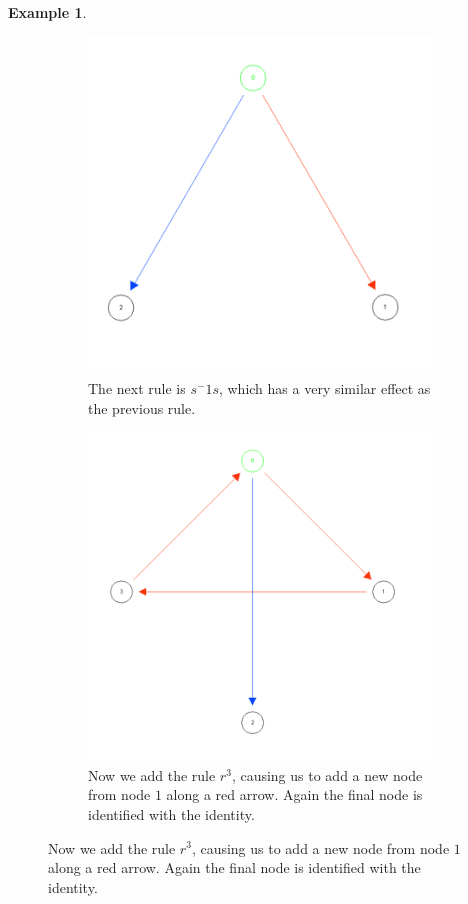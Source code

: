 \documentclass[10pt]{article}
\theoremstyle{plain}
\theoremstyle{definition}
\newtheorem{example}[theorem]{Example}
\theoremstyle{definition}
\theoremstyle{definition}
\begin{document}
\begin{multicols}{2}
\begin{example}
\begin{figure}[p]
		\begin{subfigure}{.4\textwidth}
			\centering
			\includegraphics[scale = 0.55]{TC3}
			\caption{The next rule is $s^-1 s$, which has a very similar effect as the previous rule.}
			\label{fig4:sub3}
		\end{subfigure}
		\begin{subfigure}{.4\textwidth}
			\centering
			\includegraphics[scale = 0.55]{TC4}
			\caption{Now we add the rule $r^3$, causing us to add a new node from node $1$ along a red arrow. Again the final node is identified with the identity.}
			\label{fig4:sub4}
		\end{subfigure}


\end{figure}
\end{example}
\end{multicols}
\end{document}
